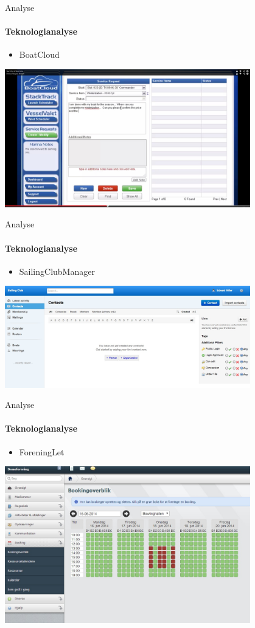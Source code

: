 \begin{frame}{Analyse}
\framesubtitle{Teknologianalyse}
  \begin{itemize}
    \item BoatCloud
  \end{itemize}
        \includegraphics[width=0.8\textwidth]{images/TicketTracker.jpg} 
\end{frame}

\begin{frame}{Analyse}
\framesubtitle{Teknologianalyse}
  \begin{itemize}
    \item SailingClubManager
  \end{itemize}
\includegraphics[width=0.8\textwidth]{images/SCM.jpg}
\end{frame}

\begin{frame}{Analyse}
\framesubtitle{Teknologianalyse}
  \begin{itemize}
    \item ForeningLet
  \end{itemize}
        \includegraphics[width=0.8\textwidth]{images/ForeningLet.jpg}
\end{frame}

